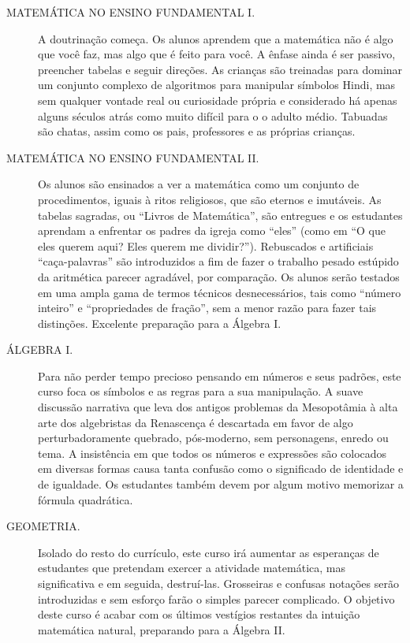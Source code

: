 \documentclass[a4paper,oneside,10pt,notitlepage]{article}
\begin{document}
\begin{description}
\item[MATEMÁTICA NO ENSINO FUNDAMENTAL I.]
A doutrinação começa.
Os alunos aprendem que a matemática não é algo que você faz, mas algo que é feito para você.
A ênfase ainda é ser passivo, preencher tabelas e seguir direções.
As crianças são treinadas para dominar um conjunto complexo de algoritmos para manipular símbolos Hindi, mas sem qualquer vontade real ou curiosidade própria e considerado há apenas alguns séculos atrás como muito difícil para o o adulto médio.
Tabuadas são chatas, assim como os pais, professores e as próprias crianças.

\item[MATEMÁTICA NO ENSINO FUNDAMENTAL II.]
Os alunos são ensinados a ver a matemática como um conjunto de procedimentos, iguais à ritos religiosos, que são eternos e imutáveis.
As tabelas sagradas, ou ``Livros de Matemática'', são entregues e os estudantes aprendam a enfrentar os padres da igreja como ``eles'' (como em ``O que eles querem aqui? Eles querem me dividir?'').
Rebuscados e artificiais ``caça-palavras'' são introduzidos a fim de  fazer o trabalho pesado estúpido da aritmética parecer agradável, por comparação.
Os alunos serão testados em uma ampla gama de termos técnicos desnecessários, tais como ``número inteiro'' e ``propriedades de fração'', sem a menor razão para fazer tais distinções.
Excelente preparação para a Álgebra I. 

\item[ÁLGEBRA I.]
Para não perder tempo precioso pensando em números e seus padrões, este curso foca os símbolos e as regras para a sua manipulação.
A suave discussão narrativa que leva dos antigos problemas da Mesopotâmia à alta arte dos algebristas da Renascença é descartada em favor de algo perturbadoramente quebrado, pós-moderno, sem personagens, enredo ou tema.
A insistência em que todos os números e expressões são colocados em diversas formas causa tanta confusão como o significado de identidade e de igualdade.
Os estudantes também devem por algum motivo memorizar a fórmula quadrática.

\item[GEOMETRIA.]
Isolado do resto do currículo, este curso irá aumentar as esperanças de estudantes que pretendam exercer a atividade matemática, mas significativa e em seguida, destruí-las.
Grosseiras e confusas notações serão introduzidas e sem esforço farão o simples parecer complicado.
O objetivo deste curso é acabar com os últimos vestígios restantes da intuição matemática natural, preparando para a Álgebra II.


\end{description}
\end{document}
